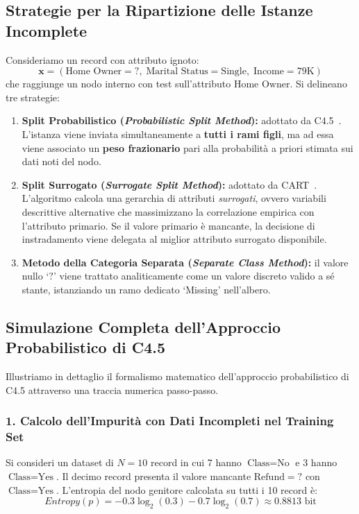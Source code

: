 \FloatBarrier
\subsection{Strategie per la Ripartizione delle Istanze Incomplete}
\label{subsec:dm-missing-strategies}

Consideriamo un record con attributo ignoto:
\begin{equation*}
    \mathbf{x} = (\text{Home Owner}=?, \; \text{Marital Status}=\text{Single}, \; \text{Income}=79\text{K})
\end{equation*}
che raggiunge un nodo interno con test sull'attributo $\text{Home Owner}$. Si delineano tre strategie:
\begin{enumerate}
    \item \textbf{Split Probabilistico (\textit{Probabilistic Split Method}):} adottato da C4.5~\cite{quinlan1993}. L'istanza viene inviata simultaneamente a \textbf{tutti i rami figli}, ma ad essa viene associato un \textbf{peso frazionario} pari alla probabilità a priori stimata sui dati noti del nodo.
    \item \textbf{Split Surrogato (\textit{Surrogate Split Method}):} adottato da CART~\cite{breiman1984}. L'algoritmo calcola una gerarchia di attributi \textit{surrogati}, ovvero variabili descrittive alternative che massimizzano la correlazione empirica con l'attributo primario. Se il valore primario è mancante, la decisione di instradamento viene delegata al miglior attributo surrogato disponibile.
    \item \textbf{Metodo della Categoria Separata (\textit{Separate Class Method}):} il valore nullo `$?$' viene trattato analiticamente come un valore discreto valido a sé stante, istanziando un ramo dedicato `Missing' nell'albero.
\end{enumerate}

\FloatBarrier
\subsection{Simulazione Completa dell'Approccio Probabilistico di C4.5}
\label{subsec:dm-c45-missing-trace}

Illustriamo in dettaglio il formalismo matematico dell'approccio probabilistico di C4.5 attraverso una traccia numerica passo-passo.

\subsubsection{1. Calcolo dell'Impurità con Dati Incompleti nel Training Set}
Si consideri un dataset di $N = 10$ record in cui 7 hanno $\text{Class}=\text{No}$ e 3 hanno $\text{Class}=\text{Yes}$. Il decimo record presenta il valore mancante $\text{Refund}=?$ con $\text{Class}=\text{Yes}$.
L'entropia del nodo genitore calcolata su tutti i 10 record è:
\begin{equation}
    Entropy(p) = -0.3 \log_2(0.3) - 0.7 \log_2(0.7) \approx 0.8813 \text{ bit}
\end{equation}

